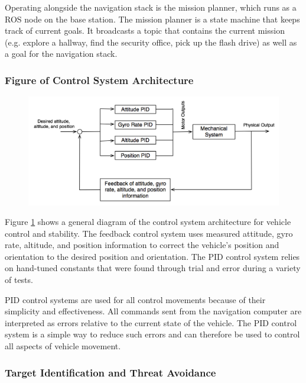 \documentclass[12pt, letterpaper]{article}
\begin{document}
Operating alongside the navigation stack is the mission planner, which runs as a ROS node on the base station.  The mission planner is a state machine that keeps track of current goals.  It broadcasts a topic that contains the current mission (e.g. explore a hallway, find the security office, pick up the flash drive) as well as a goal for the navigation stack.

\subsubsection{Figure of Control System Architecture}

\begin{figure}[h]
\centering
\includegraphics[width=14cm]{images/Control-System-Diagram.png}
\label{fig:controlsystem}
\end{figure}

Figure \ref{fig:controlsystem} shows a general diagram of the control system architecture for vehicle control and stability. The feedback control system uses measured attitude, gyro rate, altitude, and position information to correct the vehicle's position and orientation to the desired position and orientation. The PID control system relies on hand-tuned constants that were found through trial and error during a variety of tests. 

PID control systems are used for all control movements because of their simplicity and effectiveness. All commands sent from the navigation computer are interpreted as errors relative to the current state of the vehicle. The PID control system is a simple way to reduce such errors and can therefore be used to control all aspects of vehicle movement.

\subsubsection{Target Identification and Threat Avoidance}
\end{document}
